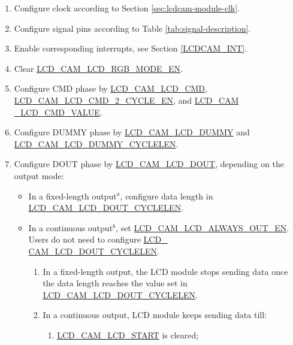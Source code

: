 \documentclass[main\_\_EN.tex]{subfiles}
\begin{document}
\begin{enumerate}
    \item Configure clock according to Section \ref{sec:lcdcam-module-clk}.

    \item Configure signal pins according to Table \ref{tab:signal-description}.

    \item Enable corresponding interrupts, see Section \ref{LCDCAM_INT}.\label{LCDCAM-TX-INTERRUPT}

    \item Clear \hyperref[fielddesc:LCDCAMLCDRGBMODEEN]{LCD\_CAM\_LCD\_RGB\_MODE\_EN}.
    \item Configure CMD phase by \hyperref[fielddesc:LCDCAMLCDCMD]{LCD\_CAM\_LCD\_CMD}, \hyperref[fielddesc:LCDCAMLCDCMD2CYCLEEN]{LCD\_CAM\_LCD\_CMD\_2\_CYCLE\_EN}, and \hyperref[fielddesc:LCDCAMLCDCMDVALUE]{LCD\_CAM\\\_LCD\_CMD\_VALUE}.
    \item Configure DUMMY phase by \hyperref[fielddesc:LCDCAMLCDDUMMY]{LCD\_CAM\_LCD\_DUMMY} and \hyperref[fielddesc:LCDCAMLCDDUMMYCYCLELEN]{LCD\_CAM\_LCD\_DUMMY\_CYCLELEN}.
    \item Configure DOUT phase by \hyperref[fielddesc:LCDCAMLCDDOUT]{LCD\_CAM\_LCD\_DOUT}, depending on the output mode:
\begin{itemize}
    \item In a fixed-length output\hyperref[note-1]{$^a$}, configure data length in \hyperref[fielddesc:LCDCAMLCDDOUTCYCLELEN]{LCD\_CAM\_LCD\_DOUT\_CYCLELEN}.
    \item In a continuous output\hyperref[note-2]{$^b$}, set \hyperref[fielddesc:LCDCAMLCDALWAYSOUTEN]{LCD\_CAM\_LCD\_ALWAYS\_OUT\_EN}. Users do not need to configure \hyperref[fielddesc:LCDCAMLCDDOUTCYCLELEN]{LCD\_\\CAM\_LCD\_DOUT\_CYCLELEN}.
\begin{tiplisting}
\vspace{-2em}
\begin{enumerate}
    \item \label{note-1}
    In a fixed-length output, the LCD module stops sending data once the data length reaches the value set in \hyperref[fielddesc:LCDCAMLCDDOUTCYCLELEN]{LCD\_CAM\_LCD\_DOUT\_CYCLELEN}.
    \item \label{note-2} In a continuous output, LCD module keeps sending data till:
    \begin{enumerate}
        \item \hyperref[fielddesc:LCDCAMLCDSTART]{LCD\_CAM\_LCD\_START} is cleared;

\end{enumerate}
\end{enumerate}
\end{tiplisting}
\end{itemize}
\end{enumerate}
\end{document}
